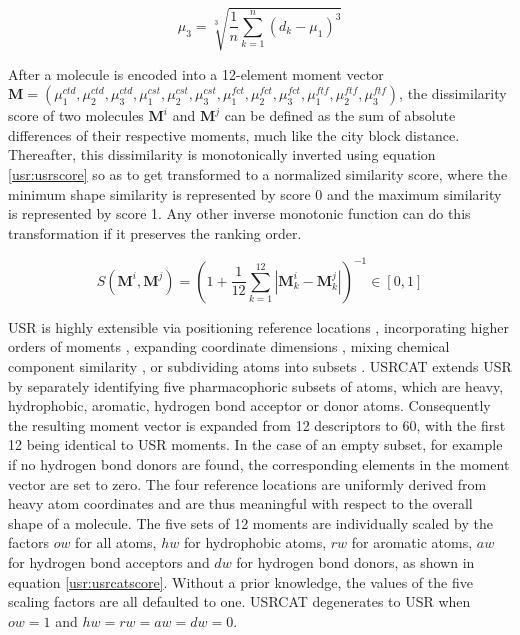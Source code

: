 \begin{equation}
\mu_3=\sqrt[3]{\frac{1}{n}\sum_{k=1}^{n}{(d_k-\mu_1)^3}}
\label{usr:moment3}
\end{equation}

After a molecule is encoded into a 12-element moment vector $\mathbf M=(\mu_1^{ctd}, \mu_2^{ctd}, \mu_3^{ctd}, \mu_1^{cst}, \mu_2^{cst}, \mu_3^{cst}, \mu_1^{fct}, \mu_2^{fct}, \mu_3^{fct}, \mu_1^{ftf}, \mu_2^{ftf}, \mu_3^{ftf})$, the dissimilarity score of two molecules $\mathbf M^i$ and $\mathbf M^j$ can be defined as the sum of absolute differences of their respective moments, much like the city block distance. Thereafter, this dissimilarity is monotonically inverted using equation \eqref{usr:usrscore} so as to get transformed to a normalized similarity score, where the minimum shape similarity is represented by score 0 and the maximum similarity is represented by score 1. Any other inverse monotonic function can do this transformation if it preserves the ranking order.

\begin{equation}
S(\mathbf M^i, \mathbf M^j)=(1+\frac{1}{12}\sum_{k=1}^{12}|\mathbf M_k^i-\mathbf M_k^j|)^{-1}\in[0, 1]
\label{usr:usrscore}
\end{equation}

USR \citep{1379} is highly extensible via positioning reference locations \citep{1334,1335}, incorporating higher orders of moments \citep{1333,1337}, expanding coordinate dimensions \citep{1337,1338}, mixing chemical component similarity \citep{1333,1407,1408}, or subdividing atoms into subsets \citep{1436,1331}. USRCAT \citep{1331} extends USR \citep{1379} by separately identifying five pharmacophoric subsets of atoms, which are heavy, hydrophobic, aromatic, hydrogen bond acceptor or donor atoms. Consequently the resulting moment vector is expanded from 12 descriptors to 60, with the first 12 being identical to USR moments. In the case of an empty subset, for example if no hydrogen bond donors are found, the corresponding elements in the moment vector are set to zero. The four reference locations are uniformly derived from heavy atom coordinates and are thus meaningful with respect to the overall shape of a molecule. The five sets of 12 moments are individually scaled by the factors $ow$ for all atoms, $hw$ for hydrophobic atoms, $rw$ for aromatic atoms, $aw$ for hydrogen bond acceptors and $dw$ for hydrogen bond donors, as shown in equation \eqref{usr:usrcatscore}. Without a prior knowledge, the values of the five scaling factors are all defaulted to one. USRCAT degenerates to USR when $ow=1$ and $hw=rw=aw=dw=0$.

